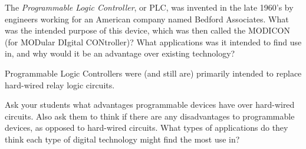 

The {\it Programmable Logic Controller}, or PLC, was invented in the late 1960's by engineers working for an American company named Bedford Associates.  What was the intended purpose of this device, which was then called the MODICON (for MODular DIgital CONtroller)?  What applications was it intended to find use in, and why would it be an advantage over existing technology?







Programmable Logic Controllers were (and still are) primarily intended to replace hard-wired relay logic circuits.







Ask your students what advantages programmable devices have over hard-wired circuits.  Also ask them to think if there are any disadvantages to programmable devices, as opposed to hard-wired circuits.  What types of applications do they think each type of digital technology might find the most use in?




